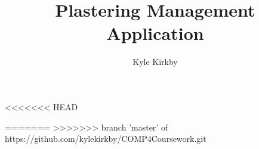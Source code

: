 \documentclass{report}
\begin{document}
\title{Plastering Management Application}
\author{Kyle Kirkby}
<<<<<<< HEAD

=======
>>>>>>> branch 'master' of https://github.com/kylekirkby/COMP4Coursework.git
\maketitle
\tableofcontents






\end{document}
